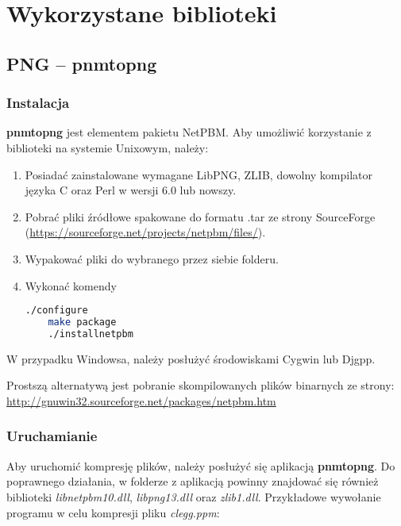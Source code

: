 \section{Wykorzystane biblioteki}

\subsection{PNG -- pnmtopng}

\subsubsection{Instalacja}

\textbf{pnmtopng} jest elementem pakietu NetPBM. Aby umożliwić korzystanie z biblioteki na systemie Unixowym, należy:

\begin{enumerate}
	\item Posiadać zainstalowane wymagane LibPNG, ZLIB, dowolny kompilator języka C oraz Perl w wersji 6.0 lub nowszy.
	\item Pobrać pliki źródłowe spakowane do formatu .tar ze strony SourceForge (\url{https://sourceforge.net/projects/netpbm/files/}).
	
	\item Wypakować pliki do wybranego przez siebie folderu.
	
	\item Wykonać komendy
	\begin{lstlisting}[language=bash]
	./configure
	make package
	./installnetpbm
	\end{lstlisting}
\end{enumerate}

W przypadku Windowsa, należy posłużyć środowiskami Cygwin lub Djgpp.

Prostszą alternatywą jest pobranie skompilowanych plików binarnych ze strony: \url{http://gnuwin32.sourceforge.net/packages/netpbm.htm}

\subsubsection{Uruchamianie}

Aby uruchomić kompresję plików, należy posłużyć się aplikacją \textbf{pnmtopng}. Do poprawnego działania, w folderze z aplikacją powinny znajdować się również biblioteki \textit{libnetpbm10.dll}, \textit{libpng13.dll} oraz \textit{zlib1.dll}. Przykładowe wywołanie programu w celu kompresji pliku \textit{clegg.pp\textsl{}m}:

